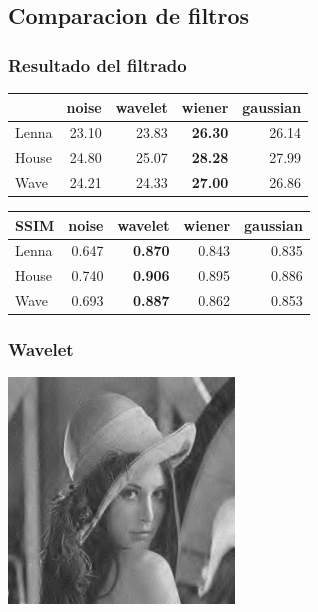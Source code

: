 \documentclass{beamer}
\begin{document}
  \subsection{Comparacion de filtros}

  \begin{frame}
    \frametitle{Resultado del filtrado}
    \centering
    \begin{tabular}{lrrrr}
      \toprule
      {} &  noise &  wavelet &  wiener &  gaussian \\
      \midrule
      Lenna &  23.10 &    23.83 &   \bf{26.30} &     26.14 \\
      House &  24.80 &    25.07 &   \bf{28.28} &     27.99 \\
      Wave &  24.21 &    24.33 &   \bf{27.00} &     26.86 \\
      \bottomrule
      \end{tabular}
    
  
    \begin{tabular}{lrrrr}
      { SSIM } &  noise &  wavelet &  wiener &  gaussian \\
      \midrule
      Lenna &  0.647 &  \bf{0.870} &  0.843 &  0.835 \\
      House &  0.740 &  \bf{0.906} &  0.895 &  0.886 \\
      Wave &  0.693 &  \bf{0.887} &  0.862 &  0.853 \\
      \bottomrule
      \end{tabular}
  \end{frame}

  \begin{frame}
    \frametitle{Wavelet}
    \centering
    \includegraphics[width=6cm]{imgs/Comparacion/wavelet_Lenna.jpg}
  
  \end{frame}
\end{document}
